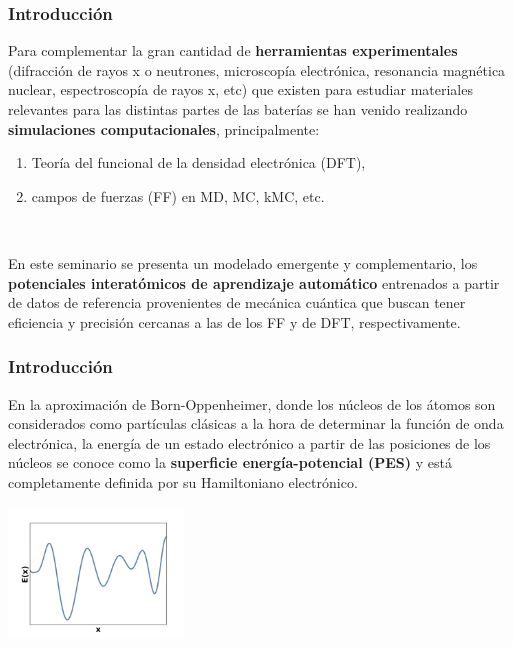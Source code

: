 \documentclass[aspectratio=169]{beamer}
\let\oldtextbf\textbf
\renewcommand{\textbf}[1]{\textcolor{nordblue}{\oldtextbf{#1}}}
\begin{document}
    \begin{frame}
        \frametitle{Introducción}
        
        Para complementar la gran cantidad de \textbf{herramientas experimentales}
        (difracción de rayos x o neutrones, microscopía electrónica, resonancia
        magnética nuclear, espectroscopía de rayos x, etc) que existen para 
        estudiar materiales relevantes para las distintas partes de las baterías 
        se han venido realizando \textbf{simulaciones computacionales}, 
        principalmente:
        \begin{enumerate}
            \item Teoría del funcional de la densidad electrónica (DFT),
            \item campos de fuerzas (FF) en MD, MC, kMC, etc.
        \end{enumerate}

        \ \pause

        En este seminario se presenta un modelado emergente y complementario, los
        \textbf{potenciales interatómicos de aprendizaje automático} entrenados a 
        partir de datos de referencia provenientes de mecánica cuántica que buscan
        tener eficiencia y precisión cercanas a las de los FF y de DFT, 
        respectivamente.

	\end{frame}

    \begin{frame}
        \frametitle{Introducción}

        En la aproximación de Born-Oppenheimer, donde los núcleos de los átomos
        son considerados como partículas clásicas a la hora de determinar la 
        función de onda electrónica, la energía de un estado electrónico a partir 
        de las posiciones de los núcleos se conoce como la \textbf{superficie 
        energía-potencial (PES)} y está completamente definida por su Hamiltoniano
        electrónico.

        \pause

        \begin{center}
            \includegraphics[width=0.35\textwidth]{intro-pes.png}
        \end{center}

	\end{frame}
\end{document}
